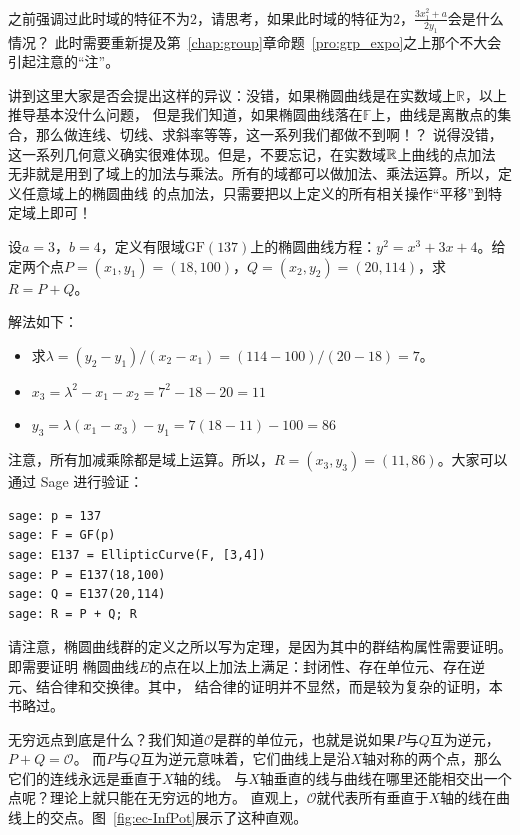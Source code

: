 \begin{thinking}
之前强调过此时域的特征不为$2$，请思考，如果此时域的特征为$2$，$\frac{3x_1^2 + a}{2y_1 }$会是什么情况？
此时需要重新提及第~\ref{chap:group}章命题~\ref{pro:grp_expo}之上那个不大会引起注意的“注”。%
\end{thinking}

讲到这里大家是否会提出这样的异议：没错，如果椭圆曲线是在实数域上$\mathbb{R}$，以上推导基本没什么问题，
但是我们知道，如果椭圆曲线落在$\mathbb{F}$上，曲线是离散点的集合，那么做连线、切线、求斜率等等，这一系列我们都做不到啊！？
说得没错，这一系列几何意义确实很难体现。但是，不要忘记，在实数域${\mathbb R}$上曲线的点加法
无非就是用到了域上的加法与乘法。所有的域都可以做加法、乘法运算。所以，定义任意域上的椭圆曲线
的点加法，只需要把以上定义的所有相关操作“平移”到特定域上即可！

\begin{example}
设$a = 3$，$b=4$，定义有限域$\mathrm{GF}(137)$上的椭圆曲线方程：$y^2 = x^3 + 3x + 4$。给定两个点$P = (x_1,y_1)=(18,100)$，$Q=(x_2,y_2)=(20,114)$，求$R = P + Q$。

解法如下：
\begin{itemize}
\item 求$\lambda = (y_2 - y_1) / (x_2 - x_1) = (114 - 100)/(20 - 18) = 7$。
\item $x_3 = \lambda^2 - x_1 - x_2 = 7^2 - 18 - 20 = 11$
\item $y_3 = \lambda(x_1 - x_3) - y_1 = 7(18-11) - 100 = 86$ 
\end{itemize}
注意，所有加减乘除都是域上运算。所以，$R =(x_3,y_3)=(11, 86)$。大家可以通过 Sage 进行验证：
\end{example}

\begin{lstlisting}
sage: p = 137
sage: F = GF(p)
sage: E137 = EllipticCurve(F, [3,4])
sage: P = E137(18,100)
sage: Q = E137(20,114)
sage: R = P + Q; R
\end{lstlisting}

请注意，椭圆曲线群的定义之所以写为定理，是因为其中的群结构属性需要证明。即需要证明
椭圆曲线$E$的点在以上加法上满足：封闭性、存在单位元、存在逆元、结合律和交换律。其中，
结合律的证明并不显然，而是较为复杂的证明，本书略过。

无穷远点到底是什么？我们知道$\mathcal{O}$是群的单位元，也就是说如果$P$与$Q$互为逆元，$P + Q = \mathcal{O}$。
而$P$与$Q$互为逆元意味着，它们曲线上是沿$X$轴对称的两个点，那么它们的连线永远是垂直于$X$轴的线。
与$X$轴垂直的线与曲线在哪里还能相交出一个点呢？理论上就只能在无穷远的地方。
直观上，$\mathcal{O}$就代表所有垂直于$X$轴的线在曲线上的交点。图~\ref{fig:ec-InfPot}展示了这种直观。

